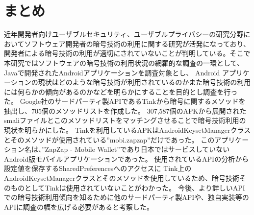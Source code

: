 \newpage
\section{まとめ}

近年開発者向けユーザブルセキュリティ、ユーザブルプライバシーの研究分野においてソフトウェア開発者の暗号技術の利用に関する研究が活発になっており、
開発者による暗号技術の利用が適切にされていないことが判明している。そこで本研究ではソフトウェアの暗号技術の利用状況の網羅的な調査の一環として、
Javaで開発されたAndroidアプリケーションを調査対象とし、
Android アプリケーションの現状はどのような暗号技術が利用されているのかまた暗号技術の利用には何らかの傾向があるのかなどを明らかにすることを目的とし調査を行った。
Google社のサードパーティ製APIであるTinkから暗号に関するメソッドを抽出し、705個のメソッドリストを作成した。
307,587個のAPKから展開されたsmaliファイルとこのメソッドリストをマッチングさせることで暗号技術利用の現状を明らかにした。
Tinkを利用しているAPKはAndroidKeysetManagerクラスとそのメソッドが使用されている''mobi.zapzap''だけであった。
このアプリケーション名は、”ZapZap - Mobile Wallet”であり日本ではサービスしていないAndroid版モバイルアプリケーションであった。
使用されているAPIの分析から設定値を保存するSharedPreferencesへのアクセスに
Tink上のAndroidKeysetManagerクラスとそのメソッドを使用しているため、暗号技術そのものとしてTinkは使用されていないことがわかった。
今後、より詳しいAPIでの暗号技術利用傾向を知るために他のサードパーティ製APIや、独自実装等のAPIに調査の幅を広げる必要があると考察した。